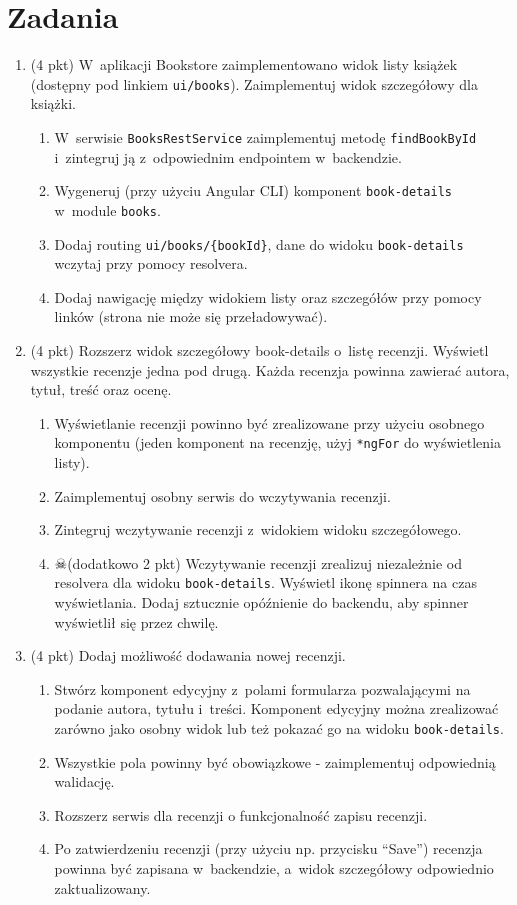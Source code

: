 \documentclass[12pt]{article}
\begin{document}
    \section*{Zadania}
    \begin{enumerate}
	
		\item
			(4 pkt) W~aplikacji Bookstore zaimplementowano widok listy książek (dostępny pod linkiem \texttt{ui/books}). Zaimplementuj widok szczegółowy dla książki.
			\begin{enumerate}
				\item W~serwisie \texttt{BooksRestService} zaimplementuj metodę \texttt{findBookById} i~zintegruj ją z~odpowiednim endpointem w~backendzie.
				\item Wygeneruj (przy użyciu Angular CLI) komponent \texttt{book-details} w~module \texttt{books}.
				\item Dodaj routing \texttt{ui/books/\{bookId\}}, dane do widoku \texttt{book-details} wczytaj przy pomocy resolvera.
				\item Dodaj nawigację między widokiem listy oraz szczegółów przy pomocy linków (strona nie może się przeładowywać).
			\end{enumerate}
			
		\item
			(4 pkt) Rozszerz widok szczegółowy book-details o~listę recenzji. Wyświetl wszystkie recenzje jedna pod drugą. Każda recenzja powinna zawierać autora, tytuł, treść oraz ocenę.
			\begin{enumerate}
				\item Wyświetlanie recenzji powinno być zrealizowane przy użyciu osobnego komponentu (jeden komponent na recenzję, użyj \texttt{*ngFor} do wyświetlenia listy).
				\item Zaimplementuj osobny serwis do wczytywania recenzji.
				\item Zintegruj wczytywanie recenzji z~widokiem widoku szczegółowego.
				\item $\skull$(dodatkowo 2 pkt) Wczytywanie recenzji zrealizuj niezależnie od resolvera dla widoku \texttt{book-details}. Wyświetl ikonę spinnera na czas wyświetlania. Dodaj sztucznie opóźnienie do backendu, aby spinner wyświetlił się przez chwilę.
			\end{enumerate}
			
		\item
			(4 pkt) Dodaj możliwość dodawania nowej recenzji.
			\begin{enumerate}
				\item Stwórz komponent edycyjny z~polami formularza pozwalającymi na podanie autora, tytułu i~treści. Komponent edycyjny można zrealizować zarówno jako osobny widok lub też pokazać go na widoku \texttt{book-details}.
				\item Wszystkie pola powinny być obowiązkowe - zaimplementuj odpowiednią walidację.
				\item Rozszerz serwis dla recenzji o funkcjonalność zapisu recenzji.
				\item Po zatwierdzeniu recenzji (przy użyciu np. przycisku ``Save'') recenzja powinna być zapisana w~backendzie, a~widok szczegółowy odpowiednio zaktualizowany.
			\end{enumerate}
			

\end{enumerate}
\end{document}
